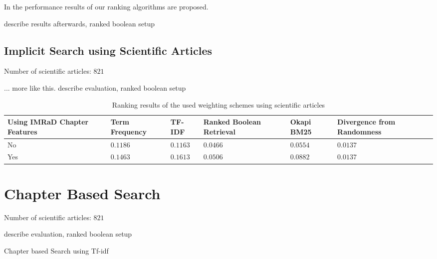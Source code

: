 In  the performance results of our ranking algorithms are proposed. %


describe results afterwards, ranked boolean setup

\subsection{Implicit Search using Scientific Articles}

Number of scientific articles: $821$

... more like this. describe evaluation, ranked boolean setup

\begin{table}[b]
    \centering
    \begin{tabular}{ C{2.1cm} C{2.1cm} C{2.1cm} C{2.1cm} C{2.1cm} C{2.1cm} }
      \toprule
      \textbf{Using IMRaD Chapter Features} & \textbf{Term Frequency} & \textbf{TF-IDF} & \textbf{Ranked Boolean Retrieval} & \textbf{Okapi BM25} & \textbf{Divergence from Randomness} \\ \midrule
      No  & $0.1186$ & $0.1163$ & $0.0466$ & $0.0554$ & $0.0137$ \\
      Yes & $0.1463$ & $0.1613$ & $0.0506$ & $0.0882$ & $0.0137$ \\
      \bottomrule
    \end{tabular}
  \caption[Ranking results using scientific articles]{Ranking results of the used weighting schemes using scientific articles}
  \label{tbl:ranking_result_full}
\end{table}


\section{Chapter Based Search}

Number of scientific articles: $821$

describe evaluation, ranked boolean setup

\begin{table}
\vrule{}\vrule
  \caption[Chapter based Search using Tf-idf]{Chapter based Search using Tf-idf}
  \label{tbl:ranking_result_full}
\end{table}

